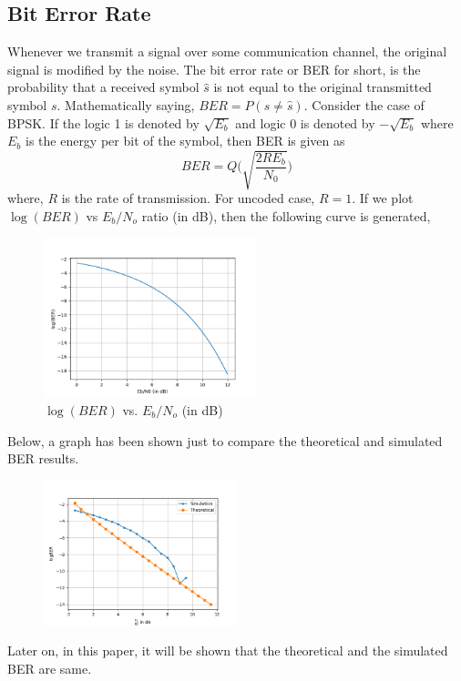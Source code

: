 \documentclass[twocolumn]{report}
\begin{document}
\subsection{Bit Error Rate}
Whenever we transmit a signal over some communication channel, the original signal is modified by the noise. The bit error rate or BER for short, is the probability that a received symbol $\hat{s}$ is not equal to the original transmitted symbol $s$. Mathematically saying, $BER = P(s \neq \hat{s})$. Consider the case of BPSK. If the logic 1 is denoted by $\sqrt{E_{b}}$ and logic 0 is denoted by $-\sqrt{E_{b}}$ where $E_{b}$ is the energy per bit of the symbol, then BER is given as 
\begin{equation}
\displaystyle BER = Q\Bigg(\sqrt{\frac{2RE_{b}}{N_{0}}}\Bigg)
\end{equation}
where, $R$ is the rate of transmission. For uncoded case, $R=1$.
If we plot $\log(BER)$ vs $E_{b}/N_{o}$ ratio (in dB), then the following curve is generated,
\begin{figure}[H]

\includegraphics[width=0.55\textwidth, height=0.3\textheight]{bervsebno.png} 
\caption{$\log(BER)$ vs. $E_{b}/N_{o}$ (in dB)}
\end{figure}
Below, a graph has been shown just to compare the theoretical and simulated BER results.
\begin{figure}[H]
\includegraphics[width=0.5\textwidth, height=0.3\textheight]{thvspr_uncoded.png}
\end{figure}
Later on, in this paper, it will be shown that the theoretical and the simulated BER are same.
\end{document}
